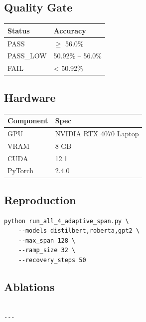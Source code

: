 \subsection{Quality Gate}

\begin{table}[H]
\centering
\small
\begin{tabular}{ll}
\toprule
\textbf{Status} & \textbf{Accuracy} \\
\midrule
PASS & $\ge$ 56.0\% \\
PASS\_LOW & 50.92\% -- 56.0\% \\
FAIL & < 50.92\% \\
\bottomrule
\end{tabular}
\end{table}

\subsection{Hardware}

\begin{table}[H]
\centering
\small
\begin{tabular}{ll}
\toprule
\textbf{Component} & \textbf{Spec} \\
\midrule
GPU & NVIDIA RTX 4070 Laptop \\
VRAM & 8 GB \\
CUDA & 12.1 \\
PyTorch & 2.4.0 \\
\bottomrule
\end{tabular}
\end{table}

\subsection{Reproduction}

\begin{lstlisting}
python run_all_4_adaptive_span.py \
    --models distilbert,roberta,gpt2 \
    --max_span 128 \
    --ramp_size 32 \
    --recovery_steps 50
\end{lstlisting}

\subsection{Ablations}

\begin{lstlisting}

---
\end{lstlisting}